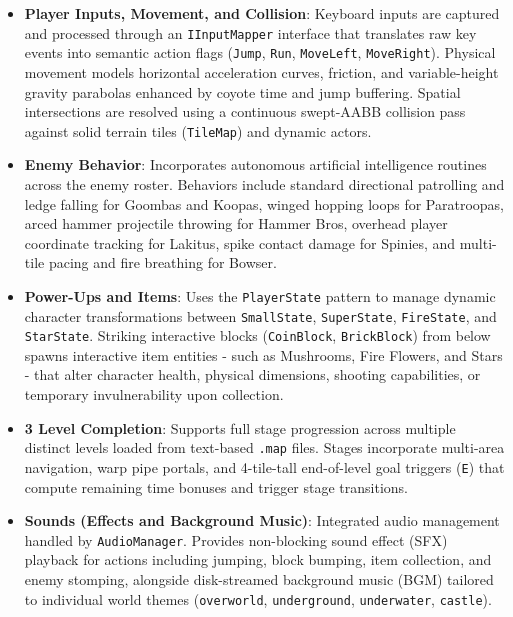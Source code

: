 \documentclass[12pt, a4paper]{article}
\begin{document}
\begin{itemize}
\item \textbf{Player Inputs, Movement, and Collision}: Keyboard inputs are captured and processed through an \texttt{IInputMapper} interface that translates raw key events into semantic action flags (\texttt{Jump}, \texttt{Run}, \texttt{MoveLeft}, \texttt{MoveRight}). Physical movement models horizontal acceleration curves, friction, and variable-height gravity parabolas enhanced by coyote time and jump buffering. Spatial intersections are resolved using a continuous swept-AABB collision pass against solid terrain tiles (\texttt{TileMap}) and dynamic actors.

\item \textbf{Enemy Behavior}: Incorporates autonomous artificial intelligence routines across the enemy roster. Behaviors include standard directional patrolling and ledge falling for Goombas and Koopas, winged hopping loops for Paratroopas, arced hammer projectile throwing for Hammer Bros, overhead player coordinate tracking for Lakitus, spike contact damage for Spinies, and multi-tile pacing and fire breathing for Bowser.

\item \textbf{Power-Ups and Items}: Uses the \texttt{PlayerState} pattern to manage dynamic character transformations between \texttt{SmallState}, \texttt{SuperState}, \texttt{FireState}, and \texttt{StarState}. Striking interactive blocks (\texttt{CoinBlock}, \texttt{BrickBlock}) from below spawns interactive item entities - such as Mushrooms, Fire Flowers, and Stars - that alter character health, physical dimensions, shooting capabilities, or temporary invulnerability upon collection.

\item \textbf{3 Level Completion}: Supports full stage progression across multiple distinct levels loaded from text-based \texttt{.map} files. Stages incorporate multi-area navigation, warp pipe portals, and 4-tile-tall end-of-level goal triggers (\texttt{E}) that compute remaining time bonuses and trigger stage transitions.

\item \textbf{Sounds (Effects and Background Music)}: Integrated audio management handled by \texttt{AudioManager}. Provides non-blocking sound effect (SFX) playback for actions including jumping, block bumping, item collection, and enemy stomping, alongside disk-streamed background music (BGM) tailored to individual world themes (\texttt{overworld}, \texttt{underground}, \texttt{underwater}, \texttt{castle}).

\end{itemize}
\end{document}
